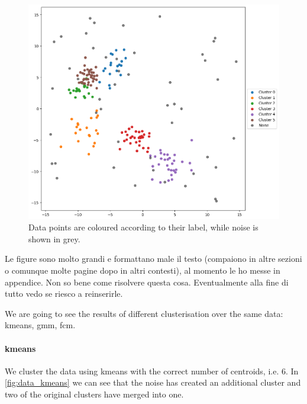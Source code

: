 \begin{figure}[ht]
    \centering
    \includegraphics[width=0.9\linewidth]{Figures/dati_veri.png}
    \caption[Example of data for clustering]{Data points are coloured according to their label, while noise is shown in grey.}
    \label{fig:data_true}
\end{figure}

\begin{toDo}
	Le figure sono molto grandi e formattano male il testo (compaiono in altre sezioni o comunque molte pagine dopo in altri contesti), al momento le ho messe in appendice. Non so bene come risolvere questa cosa. Eventualmente alla fine di tutto vedo se riesco a reinserirle.
\end{toDo}

\begin{toReview}
	We are going to see the results of different clusterisation over the same data: \gls{kmeans}, \gls{gmm}, \gls{fcm}.
\end{toReview}
\paragraph{\gls{kmeans}} We cluster the data using \gls{kmeans} with the correct number of centroids, i.e. $6$. In \cref{fig:data_kmeans} we can see that the noise has created an additional cluster and two of the original clusters have merged into one.

